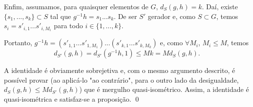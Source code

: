 \begin{lemma}
Enfim, assumamos, para quaisquer elementos de $G$, $d_{S}(g, h) = k$. Daí, existe $\{s_1, ..., s_k\} \subset S$ tal que $g^{-1}h = s_1 ... s_k$. De ser $S'$ gerador e, como $S \subset G$, temos $s_i = s'_{i,1} ... s'_{i,M_i}$ para todo $i \in \{1, ..., k\}$.

Portanto, $g^{-1}h = (s'_{1,1} ... s'_{1,M_1}) ... (s'_{k,1} ... s'_{k,M_k})$ e, como $\forall M_i$, $M_i \leq M$, temos
\[
d_{S'}(g, h) = d_{S'}(g^{-1}h, 1) \leq Mk = M d_{S}(g, h).
\]

A identidade é obviamente sobrejetiva e, com o mesmo argumento descrito, é possível provar (ao aplicá-lo "ao contrário", para o outro lado da desigualdade, $d_{S}(g, h) \leq M d_{S'}(g, h)$) que é mergulho quasi-isométrico. Assim, a identidade é quasi-isométrica e satisfaz-se a proposição. \qed
\end{lemma}

